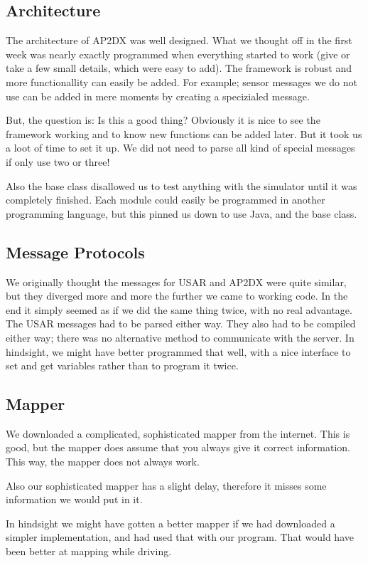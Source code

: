\subsection{Architecture}
The architecture of AP2DX was well designed. What we thought off in the first week
was nearly exactly programmed when everything started to work (give or take a few
small details, which were easy to add). The framework is robust and more functionallity
can easily be added. For example; sensor messages we do not use can be added in mere moments 
by creating a specizialed message. 

But, the question is: Is this a good thing? Obviously it is nice to see the framework working
and to know new functions can be added later. But it took us a loot of time to set it up. We 
did not need to parse all kind of special messages if only use two or three! 

Also the base class disallowed us to test anything with the simulator until it was completely 
finished. Each module could easily be programmed in another programming language, but this
pinned us down to use Java, and the base class. 

\subsection{Message Protocols}
We originally thought the messages for USAR and AP2DX were quite similar, but they diverged more
and more the further we came to working code. In the end it simply seemed as if we did the same
thing twice, with no real advantage. The USAR messages had to be parsed either way. They also
had to be compiled either way; there was no alternative method to communicate with the server. 
In hindsight, we might have better programmed that well, with a nice interface to set and get
variables rather than to program it twice. 

\subsection{Mapper}
We downloaded a complicated, sophisticated mapper from the internet. This is
good, but the mapper does assume that you always give it correct information.
This way, the mapper does not always work.

Also our sophisticated mapper has a slight delay, therefore it misses some
information we would put in it.

In hindsight we might have gotten a better mapper if we had downloaded a simpler
implementation, and had used that with our program. That would have been better
at mapping while driving.

